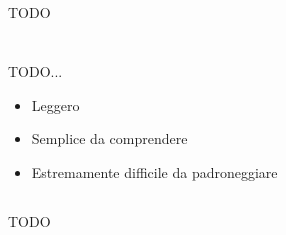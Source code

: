 
\section*{\color{Blue}{Scopo della Guida a Scrum}}
\label{sec:purpose}
TODO

\section*{\color{Blue}{Overview di Scrum}}
\label{sec:overview}
TODO...

\begin{itemize}
\item Leggero
\item Semplice da comprendere
\item Estremamente difficile da padroneggiare
\end{itemize}

\subsection*{\color{SteelBlue}{Scrum Framework}}
\label{sec:framework}
TODO
